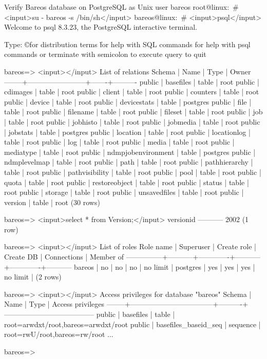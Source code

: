 \begin{commands}{Verify Bareos database on PostgreSQL as Unix user bareos}
root@linux:~# <input>su - bareos -s /bin/sh</input>
bareos@linux:~# <input>psql</input>
Welcome to psql 8.3.23, the PostgreSQL interactive terminal.

Type:  \copyright for distribution terms
       \h for help with SQL commands
       \? for help with psql commands
       \g or terminate with semicolon to execute query
       \q to quit

bareos=> <input>\dt</input>
                 List of relations
 Schema |          Name          | Type  |  Owner
--------+------------------------+-------+----------
 public | basefiles              | table | root
 public | cdimages               | table | root
 public | client                 | table | root
 public | counters               | table | root
 public | device                 | table | root
 public | devicestats            | table | postgres
 public | file                   | table | root
 public | filename               | table | root
 public | fileset                | table | root
 public | job                    | table | root
 public | jobhisto               | table | root
 public | jobmedia               | table | root
 public | jobstats               | table | postgres
 public | location               | table | root
 public | locationlog            | table | root
 public | log                    | table | root
 public | media                  | table | root
 public | mediatype              | table | root
 public | ndmpjobenvironment     | table | postgres
 public | ndmplevelmap           | table | root
 public | path                   | table | root
 public | pathhierarchy          | table | root
 public | pathvisibility         | table | root
 public | pool                   | table | root
 public | quota                  | table | root
 public | restoreobject          | table | root
 public | status                 | table | root
 public | storage                | table | root
 public | unsavedfiles           | table | root
 public | version                | table | root
(30 rows)

bareos=> <input>select * from Version;</input>
 versionid
-----------
      2002
(1 row)

bareos=> <input>\du</input>
                                 List of roles
   Role name   | Superuser | Create role | Create DB | Connections | Member of
---------------+-----------+-------------+-----------+-------------+-----------
 bareos        | no        | no          | no        | no limit    | {}
 postgres      | yes       | yes         | yes       | no limit    | {}
(2 rows)

bareos=> <input>\dp</input>
                 Access privileges for database "bareos"
 Schema |               Name                |   Type   |  Access privileges
--------+-----------------------------------+----------+--------------------------------------
 public | basefiles                         | table    | {root=arwdxt/root,bareos=arwdxt/root}
 public | basefiles_baseid_seq              | sequence | {root=rwU/root,bareos=rw/root}
...

bareos=>
\end{commands}


